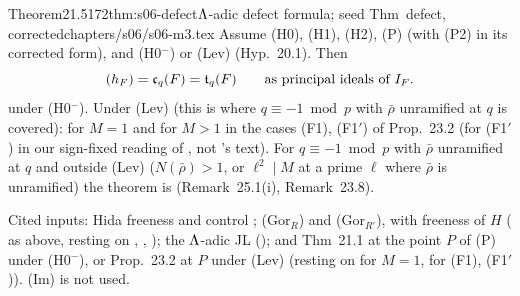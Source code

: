 \begin{quoted}{Theorem}{21.5}{172}{thm:s06-defect}{$\Lambda$-adic defect formula; seed Thm~defect, corrected}{chapters/s06/s06-m3.tex}\label{rpt:thm:s06-defect}
Assume (H0), (H1), (H2), (P) (with (P2) in its corrected form), and (H0$^-$) or (Lev) (Hyp.~20.1). Then
\[(h_F)=\mathfrak{c}_q(F)=\mathfrak{t}_q(F)\qquad\text{as principal ideals of }I_F.\]
\stpmc{} under (H0$^-$). Under (Lev) (this is where $q\equiv-1\bmod p$ with $\bar\rho$ unramified at $q$ is covered): \stpmc{} for $M=1$
and for $M>1$ in the cases (F1), (F1$'$) of Prop.~23.2 (for (F1$'$) in our sign-fixed reading of \cite[Thm~3.14]{KO}, not
\cite{KO}'s text). For $q\equiv-1\bmod p$ with $\bar\rho$ unramified at $q$ and outside (Lev) ($N(\bar\rho)>1$, or $\ell^2\mid M$ at a prime $\ell$ where $\bar\rho$ is unramified) the theorem is \stopen{} (Remark~25.1(i), Remark~23.8).

 Cited inputs: Hida freeness
and control \cite[Thm~3.1, Cor.~3.2]{Hi86b} \cite[Thm 3.1, Cor.~3.2
(3.3b), p.~250]{Hi86b}; (Gor$_R$) and (Gor$_{R'}$), with freeness of $H$ (\cite{Hs} as above, resting on \cite{Wi95}, \cite{MW86}, \cite[Cor.~8.11]{Hel}
\cite[Cor.~8.11, p.~31]{Hel04}); the $\Lambda$-adic JL
(); and Thm~21.1 at the point $P$ of (P) under (H0$^-$), or Prop.~23.2 at $P$ under
(Lev) (resting on \cite[Thm~2.9, Lemma~2.4]{KO} for $M=1$, \cite[Thm~3.14]{KO} for (F1), (F1$'$)). (Im) is not used.
\end{quoted}
